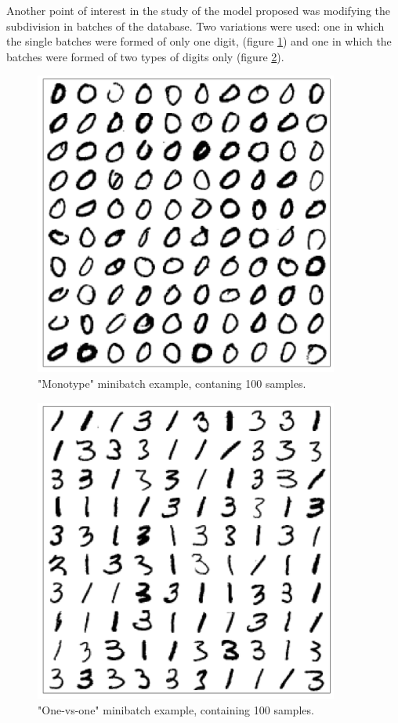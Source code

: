\documentclass[a4paper]{report}
\begin{document}
Another point of interest in the study of the model proposed was modifying the subdivision in batches of the database.
Two variations were used:
one in which the single batches were formed of only one digit, (figure \ref{monotype}) and one in which the batches were formed of two types of digits only (figure \ref{1v1}).

\begin{figure} [H]
    \centering
    \includegraphics [width=10cm ] {o/0.png}
    \caption{"Monotype" minibatch example, contaning 100 samples.}
    \label{monotype}
\end{figure}

\begin{figure} [H]
    \centering
    \includegraphics [width=10cm ] {o/31.png}
    \caption{"One-vs-one" minibatch example, containing 100 samples.}
    \label{1v1}
\end{figure}
\end{document}
